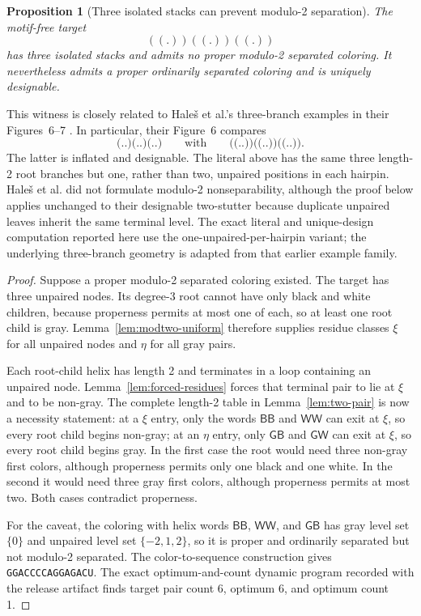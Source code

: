 \documentclass[11pt]{article}
\newtheorem{proposition}[theorem]{Proposition}
\newcommand{\Bcol}{\mathsf{B}}
\newcommand{\Wcol}{\mathsf{W}}
\newcommand{\Gray}{\mathsf{G}}
\begin{document}
\begin{proposition}[Three isolated stacks can prevent modulo-2 separation]
\label{prop:three-short}
The motif-free target
\[
((.))((.))((.))
\]
has three isolated stacks and admits no proper modulo-2 separated coloring.  It nevertheless admits a proper ordinarily separated coloring and is uniquely designable.
\end{proposition}

This witness is closely related to Hale\v{s} et al.'s three-branch examples in their Figures~6--7 \citep{hales2017}.  In particular, their Figure~6 compares
\[
\texttt{(..)(..)(..)}\qquad\text{with}\qquad\texttt{((..))((..))((..))}.
\]
The latter is inflated and designable.  The literal above has the same three length-2 root branches but one, rather than two, unpaired positions in each hairpin.  Hale\v{s} et al. did not formulate modulo-2 nonseparability, although the proof below applies unchanged to their designable two-stutter because duplicate unpaired leaves inherit the same terminal level.  The exact literal and unique-design computation reported here use the one-unpaired-per-hairpin variant; the underlying three-branch geometry is adapted from that earlier example family.

\begin{proof}
Suppose a proper modulo-2 separated coloring existed.  The target has three unpaired nodes.  Its degree-3 root cannot have only black and white children, because properness permits at most one of each, so at least one root child is gray.  Lemma~\ref{lem:modtwo-uniform} therefore supplies residue classes $\xi$ for all unpaired nodes and $\eta$ for all gray pairs.

Each root-child helix has length 2 and terminates in a loop containing an unpaired node.  Lemma~\ref{lem:forced-residues} forces that terminal pair to lie at $\xi$ and to be non-gray.  The complete length-2 table in Lemma~\ref{lem:two-pair} is now a necessity statement: at a $\xi$ entry, only the words $\Bcol\Bcol$ and $\Wcol\Wcol$ can exit at $\xi$, so every root child begins non-gray; at an $\eta$ entry, only $\Gray\Bcol$ and $\Gray\Wcol$ can exit at $\xi$, so every root child begins gray.  In the first case the root would need three non-gray first colors, although properness permits only one black and one white.  In the second it would need three gray first colors, although properness permits at most two.  Both cases contradict properness.

For the caveat, the coloring with helix words $\Bcol\Bcol$, $\Wcol\Wcol$, and $\Gray\Bcol$ has gray level set $\{0\}$ and unpaired level set $\{-2,1,2\}$, so it is proper and ordinarily separated but not modulo-2 separated.  The color-to-sequence construction gives \texttt{GGACCCCAGGAGACU}.  The exact optimum-and-count dynamic program recorded with the release artifact finds target pair count 6, optimum 6, and optimum count 1.
\end{proof}
\end{document}
